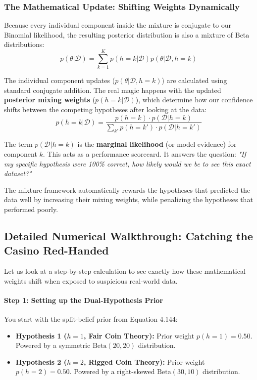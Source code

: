 \documentclass{article}
\begin{document}
\subsubsection{The Mathematical Update: Shifting Weights Dynamically}
Because every individual component inside the mixture is conjugate to our Binomial likelihood, the resulting posterior distribution is also a mixture of Beta distributions:
\begin{equation}
p(\theta|\mathcal{D}) = \sum_{k=1}^K p(h = k|\mathcal{D})p(\theta|\mathcal{D}, h = k)
\end{equation}

The individual component updates ($p(\theta|\mathcal{D}, h = k)$) are calculated using standard conjugate addition. The real magic happens with the updated \textbf{posterior mixing weights} ($p(h = k|\mathcal{D})$), which determine how our confidence shifts between the competing hypotheses after looking at the data:
\begin{equation}
p(h = k|\mathcal{D}) = \frac{p(h = k) \cdot p(\mathcal{D}|h = k)}{\sum_{k'} p(h = k') \cdot p(\mathcal{D}|h = k')}
\end{equation}

The term $p(\mathcal{D}|h = k)$ is the \textbf{marginal likelihood} (or model evidence) for component $k$. This acts as a performance scorecard. It answers the question: \textit{"If my specific hypothesis were 100\% correct, how likely would we be to see this exact dataset?"} 

The mixture framework automatically rewards the hypotheses that predicted the data well by increasing their mixing weights, while penalizing the hypotheses that performed poorly.

\subsection{Detailed Numerical Walkthrough: Catching the Casino Red-Handed}

Let us look at a step-by-step calculation to see exactly how these mathematical weights shift when exposed to suspicious real-world data.

\paragraph{Step 1: Setting up the Dual-Hypothesis Prior}
You start with the split-belief prior from Equation 4.144:
\begin{itemize}
    \item \textbf{Hypothesis 1 ($h=1$, Fair Coin Theory):} Prior weight $p(h=1) = 0.50$. Powered by a symmetric $\text{Beta}(20,20)$ distribution.
    \item \textbf{Hypothesis 2 ($h=2$, Rigged Coin Theory):} Prior weight $p(h=2) = 0.50$. Powered by a right-skewed $\text{Beta}(30,10)$ distribution.
\end{itemize}
\end{document}

